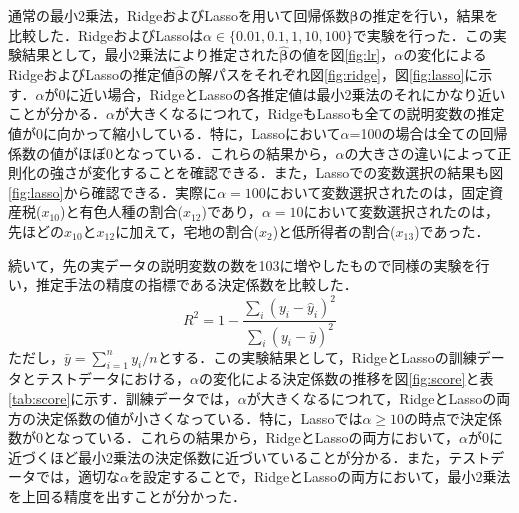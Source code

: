 \documentclass[a4paper,twocolumn]{ujarticle} %
\begin{document}
通常の最小2乗法，RidgeおよびLassoを用いて回帰係数$\bm\beta$の推定を行い，結果を比較した．RidgeおよびLassoは$\alpha \in \{0.01, 0.1, 1, 10, 100\}$で実験を行った．この実験結果として，最小2乗法により推定された$\hat{\bm{\beta}}$の値を図\ref{fig:lr}，$\alpha$の変化によるRidgeおよびLassoの推定値$\hat{\bm{\beta}}$の解パスをそれぞれ図\ref{fig:ridge}，図\ref{fig:lasso}に示す．$\alpha$が0に近い場合，RidgeとLassoの各推定値は最小2乗法のそれにかなり近いことが分かる．$\alpha$が大きくなるにつれて，RidgeもLassoも全ての説明変数の推定値が0に向かって縮小している．特に，Lassoにおいて$\alpha$=100の場合は全ての回帰係数の値がほぼ0となっている．これらの結果から，$\alpha$の大きさの違いによって正則化の強さが変化することを確認できる．また，Lassoでの変数選択の結果も図\ref{fig:lasso}から確認できる．実際に$\alpha=100$において変数選択されたのは，固定資産税($x_{10}$)と有色人種の割合($x_{12}$)であり，$\alpha=10$において変数選択されたのは，先ほどの$x_{10}$と$x_{12}$に加えて，宅地の割合($x_2$)と低所得者の割合($x_{13}$)であった．

続いて，先の実データの説明変数の数を103に増やしたもので同様の実験を行い，推定手法の精度の指標である決定係数を比較した．
\begin{equation}
	R^2 = 1 - \frac{\sum_{i}^{}(y_i - \hat{y}_i)^2}{\sum_{i}^{}(y_i - \bar{y})^2}
\end{equation}
ただし，$\bar{y}=\sum_{i=1}^{n}{y_i}/n$とする．この実験結果として，RidgeとLassoの訓練データとテストデータにおける，$\alpha$の変化による決定係数の推移を図\ref{fig:score}と表\ref{tab:score}に示す．訓練データでは，$\alpha$が大きくなるにつれて，RidgeとLassoの両方の決定係数の値が小さくなっている．特に，Lassoでは$\alpha \geq 10$の時点で決定係数が0となっている．これらの結果から，RidgeとLassoの両方において，$\alpha$が0に近づくほど最小2乗法の決定係数に近づいていることが分かる．また，テストデータでは，適切な$\alpha$を設定することで，RidgeとLassoの両方において，最小2乗法を上回る精度を出すことが分かった．
\end{document}
